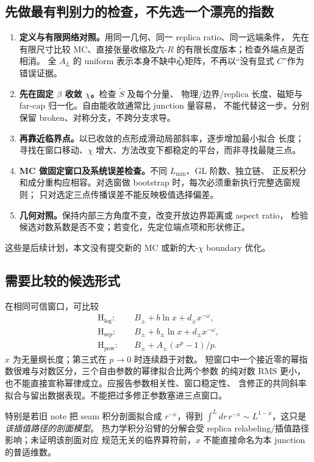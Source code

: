 \documentclass[11pt]{article}
\newcommand{\tS}{\widetilde S}
\begin{document}
\subsection{先做最有判别力的检查，不先选一个漂亮的指数}
\begin{enumerate}
\item \textbf{定义与有限网络对照。}用同一几何、同一 replica ratio、同一远端条件，
先在有限尺寸比较 MC、直接张量收缩及六-$R$ 的有限长度版本；检查外端点是否相消。
全 $A_L$ 的 uniform 表示本身不缺中心矩阵，不再以“没有显式 $C$”作为错误证据。
\item \textbf{先在固定 $\beta$ 收敛 $\chi$。}检查 $\tS$ 及每个分量、
物理/边界/replica 长度、磁矩与 far-cap 归一化。自由能收敛通常比 junction 量容易，
不能代替这一步。分别保留 broken、对称分支，不跨分支求导。
\item \textbf{再靠近临界点。}以已收敛的点形成滑动局部斜率，逐步增加最小拟合
长度；寻找在窗口移动、$\chi$ 增大、方法改变下都稳定的平台，而非寻找最陡三点。
\item \textbf{MC 做固定窗口及系统误差检查。}不同 $L_{\min}$、GL 阶数、独立链、
正反积分和成分重构应相容。对选窗做 bootstrap 时，每次必须重新执行完整选窗规则；
只对选定三点传播误差不能反映极值选择偏差。
\item \textbf{几何对照。}保持内部三方角度不变，改变开放边界距离或 aspect ratio，
检验候选对数系数是否不变；若变化，先定位端点项和形状修正。
\end{enumerate}
这些是后续计划，本文没有提交新的 MC 或新的大-$\chi$ boundary 优化。

\subsection{需要比较的候选形式}
在相同可信窗口，可比较
\begin{align}
\mathrm{H}_{\log}:\quad & B_\pm+b\ln x+d_\pm x^{-\omega},\\
\mathrm{H}_{\mathrm{sep}}:\quad & B_\pm+b_\pm\ln x+d_\pm x^{-\omega},\\
\mathrm{H}_{\mathrm{pow}}:\quad & B_\pm+A_\pm(x^p-1)/p.
\end{align}
$x$ 为无量纲长度；第三式在 $p\to0$ 时连续趋于对数。
短窗口中一个接近零的幂指数很难与对数区分，三个自由参数的幂律拟合比两个参数
的纯对数 RMS 更小，也不能直接宣称幂律成立。应报告参数相关性、窗口稳定性、
含修正的共同斜率拟合与留出数据表现。不能把过多修正参数塞进三点窗口。

特别是若旧 note 把 seam 积分剖面拟合成 $r^{-x}$，得到
$\int^L dr\,r^{-x}\sim L^{1-x}$，这只是\emph{该插值路径的剖面模型}。
热力学积分沿臂的分解会受 replica relabeling/插值路径影响；未证明该剖面对应
规范无关的临界算符前，$x$ 不能直接命名为本 junction 的普适维数。
\end{document}
